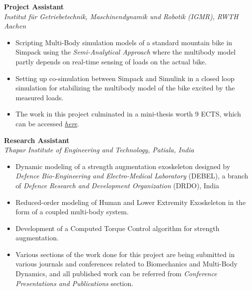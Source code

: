 \vspace{0.1 in}

\large{\textbf{Project Assistant}}
\hfill
\minithesisdate\\
\emph{\large{Institut für Getriebetechnik, Maschinendynamik und Robotik (IGMR), RWTH Aachen}}
\begin{itemize}
\item \large{Scripting Multi-Body simulation models of a standard mountain bike in Simpack using the \emph{Semi-Analytical Approach} where the multibody model partly depends on real-time sensing of loads on the actual bike.}
\item\large{Setting up co-simulation between Simpack and Simulink in a closed loop simulation for stabilizing the multibody model of the bike excited by the measured loads.}
\item\large{The work in this project culminated in a mini-thesis worth 9 ECTS, which can be accessed \href{https://github.com/average-engineer/MiniThesis_IGMR/blob/master/Thesis.pdf}{\large{\textit{here}}}.}
\end{itemize}

\vspace{0.1 in}

\large{\textbf{Research Assistant}}
\hfill
\drdodate\\
\emph{\large{Thapar Institute of Engineering and Technology, Patiala, India}}
\begin{itemize}
\item \large{Dynamic modeling of a strength augmentation exoskeleton designed by \emph{Defence Bio-Engineering and Electro-Medical Laboratory} (DEBEL), a branch of \emph{Defence Research and Development Organization} (DRDO), India}
\item\large{Reduced-order modeling of Human and Lower Extremity Exoskeleton in the form of a coupled multi-body system.}
\item\large{Development of a Computed Torque Control algorithm for strength augmentation.}
\item\large{Various sections of the work done for this project are being submitted in various journals and conferences related to Biomechanics and Multi-Body Dynamics, and all published work can be referred from \emph{Conference Presentations and Publications} section.}
\end{itemize}

